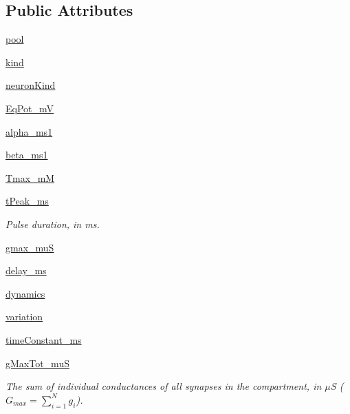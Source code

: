 \subsection*{Public Attributes}
\begin{DoxyCompactItemize}
\item 
\hyperlink{class_synapse_1_1_synapse_a133990bf3ab7f1efa8b416be73d07a11}{pool}
\item 
\hyperlink{class_synapse_1_1_synapse_aa2ea45450a3ad13cfefcae9fabe6ce15}{kind}
\item 
\hyperlink{class_synapse_1_1_synapse_a031af2fe7be76f9b5f69c087228a1b9a}{neuron\+Kind}
\item 
\hyperlink{class_synapse_1_1_synapse_adc80e9a62c17b29a92c2e7a0413e572d}{Eq\+Pot\+\_\+mV}
\item 
\hyperlink{class_synapse_1_1_synapse_ae15502cd5d5604d38328b2b1432477d7}{alpha\+\_\+ms1}
\item 
\hyperlink{class_synapse_1_1_synapse_ab59f413cbd21555531be209dee307a97}{beta\+\_\+ms1}
\item 
\hyperlink{class_synapse_1_1_synapse_ae4bcd698c5be77c2a6629d511d75f046}{Tmax\+\_\+mM}
\item 
\hyperlink{class_synapse_1_1_synapse_a09b9b092efcb0d6745fa32fadcd46375}{t\+Peak\+\_\+ms}
\begin{DoxyCompactList}\small\item\em Pulse duration, in ms. \end{DoxyCompactList}\item 
\hyperlink{class_synapse_1_1_synapse_a7922dac4765183cb6052905cc0d251cb}{gmax\+\_\+muS}
\item 
\hyperlink{class_synapse_1_1_synapse_a14adfda48133bd314f4dcd65fc9a2366}{delay\+\_\+ms}
\item 
\hyperlink{class_synapse_1_1_synapse_a67a1454de1ef2f08ffa3a10bf8466158}{dynamics}
\item 
\hyperlink{class_synapse_1_1_synapse_aa37e9a9bbac9358b50ba5280439ad319}{variation}
\item 
\hyperlink{class_synapse_1_1_synapse_a875adea3ef112a9750532b5e21d47e93}{time\+Constant\+\_\+ms}
\item 
\hyperlink{class_synapse_1_1_synapse_a470750725ecb176e048a973b9dc23ea3}{g\+Max\+Tot\+\_\+muS}
\begin{DoxyCompactList}\small\item\em The sum of individual conductances of all synapses in the compartment, in $\mu$S ( $G_{max} = \limits\sum_{i=1}^Ng_i$). \end{DoxyCompactList}\item 

\end{DoxyCompactItemize}
